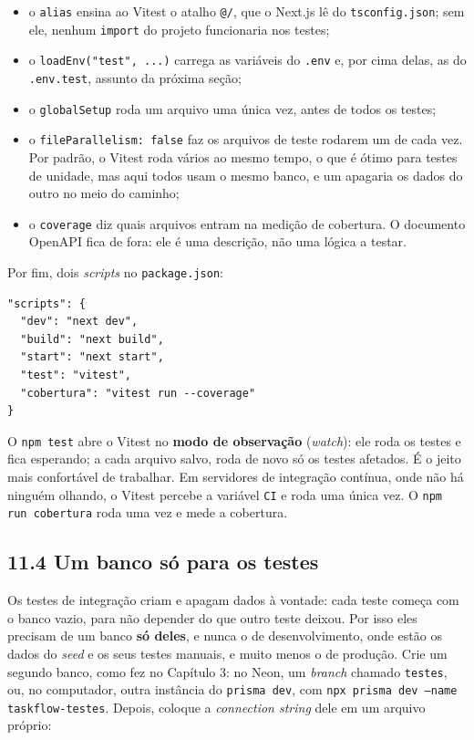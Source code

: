 \begin{itemize}
  \item o \texttt{alias} ensina ao Vitest o atalho \texttt{@/}, que o Next.js lê do \texttt{tsconfig.json}; sem ele, nenhum \texttt{import} do projeto funcionaria nos testes;
  \item o \texttt{loadEnv("test", ...)} carrega as variáveis do \texttt{.env} e, por cima delas, as do \texttt{.env.test}, assunto da próxima seção;
  \item o \texttt{globalSetup} roda um arquivo uma única vez, antes de todos os testes;
  \item o \texttt{fileParallelism: false} faz os arquivos de teste rodarem um de cada vez. Por padrão, o Vitest roda vários ao mesmo tempo, o que é ótimo para testes de unidade, mas aqui todos usam o mesmo banco, e um apagaria os dados do outro no meio do caminho;
  \item o \texttt{coverage} diz quais arquivos entram na medição de cobertura. O documento OpenAPI fica de fora: ele é uma descrição, não uma lógica a testar.
\end{itemize}

Por fim, dois \textit{scripts} no \texttt{package.json}:

\begin{codigo}
\begin{Verbatim}[breaklines=true, breaksymbolleft={}, fontsize=\footnotesize]
"scripts": {
  "dev": "next dev",
  "build": "next build",
  "start": "next start",
  "test": "vitest",
  "cobertura": "vitest run --coverage"
}
\end{Verbatim}
\end{codigo}

O \texttt{npm test} abre o Vitest no \textbf{modo de observação} (\textit{watch}): ele roda os testes e fica esperando; a cada arquivo salvo, roda de novo só os testes afetados. É o jeito mais confortável de trabalhar. Em servidores de integração contínua, onde não há ninguém olhando, o Vitest percebe a variável \texttt{CI} e roda uma única vez. O \texttt{npm run cobertura} roda uma vez e mede a cobertura.

\subsection{11.4 Um banco só para os testes}

Os testes de integração criam e apagam dados à vontade: cada teste começa com o banco vazio, para não depender do que outro teste deixou. Por isso eles precisam de um banco \textbf{só deles}, e nunca o de desenvolvimento, onde estão os dados do \textit{seed} e os seus testes manuais, e muito menos o de produção. Crie um segundo banco, como fez no Capítulo 3: no Neon, um \textit{branch} chamado \texttt{testes}, ou, no computador, outra instância do \texttt{prisma dev}, com \texttt{npx prisma dev --name taskflow-testes}. Depois, coloque a \textit{connection string} dele em um arquivo próprio:

